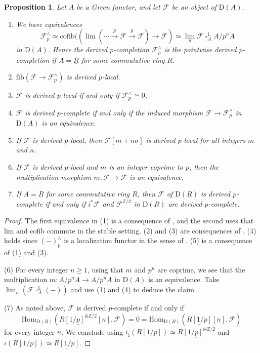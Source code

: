 \documentclass[10pt]{amsart}
\newtheorem{prop}[thm]{Proposition}
\theoremstyle{definition}
\numberwithin{equation}{section}
\renewcommand{\L}{\mathbb{L}}
\newcommand{\Z}{\mathbb{Z}}
\newcommand{\cF}{\mathcal{F}}
\newcommand{\rD}{\mathrm{D}}
\newcommand{\ul}{\underline}
\newcommand{\Hom}{\mathrm{Hom}}
\newcommand{\fib}{\mathrm{fib}}
\newcommand{\cofib}{\mathrm{cofib}}
\DeclareMathOperator{\sotimes}{\square}
\begin{document}
\begin{prop}
\label{completion results}
Let $A$ be a Green functor,
and let $\cF$ be an object of $\rD(A)$.
\begin{enumerate}
\item[\textup{(1)}]
We have equivalences
\[
\cF_p^\wedge
\simeq
\cofib((\lim(\cdots \xrightarrow{p} \cF\xrightarrow{p} \cF)\to \cF)
\simeq
\lim_n
\cF \sotimes_{A}^\L A/p^n A
\]
in $\rD(A)$.
Hence the derived $p$-completion $\cF_p^\wedge$ is the pointwise derived $p$-completion if $A=\ul{R}$ for some commutative ring $R$.
\item[\textup{(2)}]
$\fib(\cF\to \cF_p^\wedge)$ is derived $p$-local.
\item[\textup{(3)}]
$\cF$ is derived $p$-local if and only if $\cF_p^\wedge\simeq 0$.
\item[\textup{(4)}]
$\cF$ is derived $p$-complete if and only if the induced morphism $\cF\to \cF_p^\wedge$ in $\rD(A)$ is an equivalence.
\item[\textup{(5)}]
If $\cF$ is derived $p$-local,
then $\cF[m+n\sigma]$ is derived $p$-local for all integers $m$ and $n$.
\item[\textup{(6)}]
If $\cF$ is derived $p$-local and $m$ is an integer coprime to $p$,
then the multiplication morphism $m\colon \cF\to \cF$ is an equivalence.
\item[\textup{(7)}]
If $A=\ul{R}$ for some commutative ring $R$,
then $\cF$ of $\rD(\ul{R})$ is derived $p$-complete if and only if $i^*\cF$ and $\cF^{\Z/2}$ in $\rD(R)$ are derived $p$-complete.
\end{enumerate}
\end{prop}
\begin{proof}
The first equivalence in (1) is a consequence of \cite[Proposition 7.3.2.1]{SAG}, and the second uses that lim and cofib commute in the stable setting.
(2) and (3) are consequences of \cite[Remark 7.2.0.2, Proposition 7.3.1.4]{SAG}.
(4) holds since $(-)_p^\wedge$ is a localization functor in the sense of \cite[Definition 5.2.7.2]{HTT}.
(5) is a consequence of (1) and (3).

(6) For every integer $n\geq 1$,
using that $m$ and $p^n$ are coprime, we see that the multiplication $m\colon A/p^n A\to A/p^n A$ in $\rD(A)$ is an equivalence.
Take $\lim_n(\cF\sotimes_A^\L (-))$ and use (1) and (4) to deduce the claim.

(7) As noted above,
$\cF$ is derived $p$-complete if and only if
\[
\Hom_{\rD(\ul{R})}
(\ul{R[1/p]^{\oplus \Z/2}}[n],\cF) = 0 =
\Hom_{\rD(\ul{R})}
 (\ul{R[1/p]}[n],\cF)
\]
for every integer $n$.
We conclude using $i_\sharp (R[1/p])\simeq \ul{R[1/p]^{\oplus \Z/2}}$ and $\iota (R[1/p])\simeq \ul{R[1/p]}$.
\end{proof}
\end{document}
